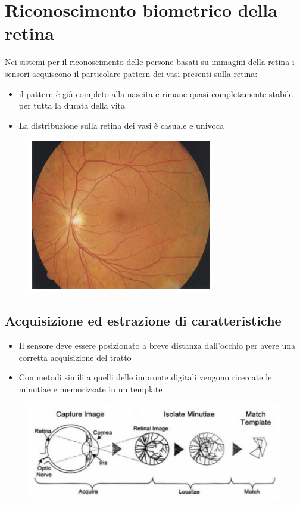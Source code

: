 \documentclass{report}
\begin{document}
\chapter{Riconoscimento biometrico della retina}

Nei sistemi per il riconoscimento delle persone basati su immagini della retina i sensori acquiscono il particolare
pattern dei vasi presenti sulla retina:
\begin{itemize}
    \item il pattern è già completo alla nascita e rimane quasi completamente stabile per 
    tutta la durata della vita 
    \item La distribuzione sulla retina dei vasi è casuale e univoca
\end{itemize}

\begin{figure}[ht]
    \centering
    \includegraphics[width=0.7\linewidth]{images/retina.png}
\end{figure}

\newpage
\section{Acquisizione ed estrazione di caratteristiche}
\begin{itemize}
    \item Il sensore deve essere posizionato a breve distanza 
    dall'occhio per avere una corretta acquisizione del tratto 
    \item Con metodi simili a quelli delle impronte digitali vengono 
    ricercate le minutiae e memorizzate in un template 
\end{itemize}

\begin{figure}[ht]
    \centering
    \includegraphics[width=1\linewidth]{images/iride-acqusizione.png}
\end{figure}
\end{document}
